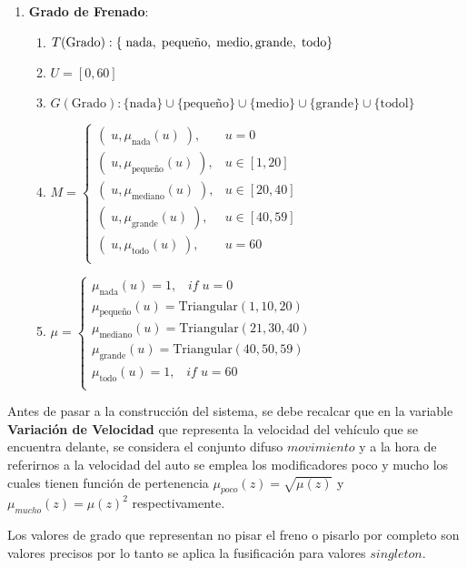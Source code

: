 \documentclass[a4paper,10pt,twocolumn]{article}
\begin{document}
\begin{enumerate}
	\item[] \textbf{Grado de Frenado}:
		\begin{enumerate}
			\item[] $T(\text{Grado}): \{ \;\text{nada}, \;\text{peque\~no}, \;\text{medio},\; \\ \text{grande}, \;\text{todo}\}$
			\item[] $U = [0, 60]$
			\item[] $G(\text{Grado}): \{\text{nada}\} \cup \{\text{peque\~no}\} \cup \{\text{medio}\} \cup \{\text{grande}\} \cup \{\text{todol}\}$
			\item[] $M = \begin{cases}
			(\;u, \mu_{\text{nada}} (u) \;), & u = 0 \\
			(\;u, \mu_{\text{peque\~no}} (u) \;), & u \in [1, 20] \\
			(\;u, \mu_{\text{mediano}} (u) \;), & u \in [20, 40] \\
			(\;u, \mu_{\text{grande}} (u) \;), & u \in [40, 59] \\
			(\;u, \mu_{\text{todo}} (u) \;), & u = 60 \\
			\end{cases}$
			\item[] $\mu = \begin{cases}
			\mu_{\text{nada}} (u) = 1, \;\;\; if \;u = 0 \\
			\mu_{\text{peque\~no}} (u) = \text{Triangular} (1, 10, 20) \\
			\mu_{\text{mediano}} (u) = \text{Triangular} (21, 30, 40)\\
			\mu_{\text{grande}} (u) = \text{Triangular} (40, 50, 59)\\
			\mu_{\text{todo}} (u) = 1, \;\;\; if\; u = 60 \\
			\end{cases}$	
		\end{enumerate}	
\end{enumerate}

Antes de pasar a la construcci\'on del sistema, se debe recalcar que en la variable \textbf{Variaci\'on de Velocidad} que representa la velocidad del veh\'iculo que se encuentra delante, se considera el conjunto difuso $movimiento$ y a la hora de referirnos a la velocidad del auto se emplea los modificadores poco y mucho los cuales tienen funci\'on de pertenencia $\mu_{poco} (z)= \sqrt{\mu (z)}$ y $\mu_{mucho} (z)= \mu (z) ^{2}$ respectivamente.

Los valores de grado que representan no pisar el freno o pisarlo por completo son valores precisos por lo tanto se aplica la fusificaci\'on para valores $singleton$.
\end{document}
